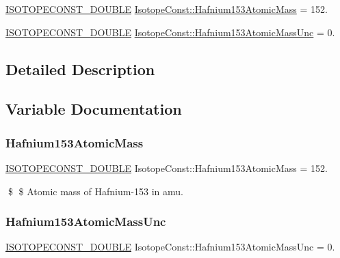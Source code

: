 \begin{DoxyCompactItemize}
\item 
\mbox{\hyperlink{group___isotope_const-_macros_ga8f45a7272ce02c0b4c65c44636ed719a}{I\+S\+O\+T\+O\+P\+E\+C\+O\+N\+S\+T\+\_\+\+D\+O\+U\+B\+LE}} \mbox{\hyperlink{group___isotope_const-_hafnium-_hf153_gaf29ee5b91e010a0cc02f06ac47100c25}{Isotope\+Const\+::\+Hafnium153\+Atomic\+Mass}} = 152.
\item 
\mbox{\hyperlink{group___isotope_const-_macros_ga8f45a7272ce02c0b4c65c44636ed719a}{I\+S\+O\+T\+O\+P\+E\+C\+O\+N\+S\+T\+\_\+\+D\+O\+U\+B\+LE}} \mbox{\hyperlink{group___isotope_const-_hafnium-_hf153_gac2ba28247fd2672f325ebbe4a729d4a5}{Isotope\+Const\+::\+Hafnium153\+Atomic\+Mass\+Unc}} = 0.
\end{DoxyCompactItemize}


\subsection{Detailed Description}


\subsection{Variable Documentation}
\mbox{\label{group___isotope_const-_hafnium-_hf153_gaf29ee5b91e010a0cc02f06ac47100c25}} 
\subsubsection{\texorpdfstring{Hafnium153\+Atomic\+Mass}{Hafnium153AtomicMass}}
{\footnotesize\ttfamily \mbox{\hyperlink{group___isotope_const-_macros_ga8f45a7272ce02c0b4c65c44636ed719a}{I\+S\+O\+T\+O\+P\+E\+C\+O\+N\+S\+T\+\_\+\+D\+O\+U\+B\+LE}} Isotope\+Const\+::\+Hafnium153\+Atomic\+Mass = 152.}

\$ \$ Atomic mass of Hafnium-\/153 in amu. \mbox{\label{group___isotope_const-_hafnium-_hf153_gac2ba28247fd2672f325ebbe4a729d4a5}} 
\subsubsection{\texorpdfstring{Hafnium153\+Atomic\+Mass\+Unc}{Hafnium153AtomicMassUnc}}
{\footnotesize\ttfamily \mbox{\hyperlink{group___isotope_const-_macros_ga8f45a7272ce02c0b4c65c44636ed719a}{I\+S\+O\+T\+O\+P\+E\+C\+O\+N\+S\+T\+\_\+\+D\+O\+U\+B\+LE}} Isotope\+Const\+::\+Hafnium153\+Atomic\+Mass\+Unc = 0.}

